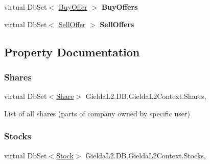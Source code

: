 \begin{DoxyCompactItemize}
virtual Db\+Set$<$ \mbox{\hyperlink{class_gielda_l2_1_1_d_b_1_1_entities_1_1_buy_offer}{Buy\+Offer}} $>$ {\bfseries Buy\+Offers}
\item 
\mbox{\label{class_gielda_l2_1_1_d_b_1_1_gielda_l2_context_a0bf04ba9775656e13e821d2992a83e36}} 
virtual Db\+Set$<$ \mbox{\hyperlink{class_gielda_l2_1_1_d_b_1_1_entities_1_1_sell_offer}{Sell\+Offer}} $>$ {\bfseries Sell\+Offers}
\end{DoxyCompactItemize}


\subsection{Property Documentation}
\mbox{\label{class_gielda_l2_1_1_d_b_1_1_gielda_l2_context_a10444d33001e7c0ae678b54d477a0b60}} 
\subsubsection{\texorpdfstring{Shares}{Shares}}
{\footnotesize\ttfamily virtual Db\+Set$<$\mbox{\hyperlink{class_gielda_l2_1_1_d_b_1_1_entities_1_1_share}{Share}}$>$ Gielda\+L2.\+D\+B.\+Gielda\+L2\+Context.\+Shares\hspace{0.3cm}{\ttfamily [get]}, {\ttfamily [set]}}



List of all shares (parts of company owned by specific user) 

\mbox{\label{class_gielda_l2_1_1_d_b_1_1_gielda_l2_context_aea04642796c9518519cce75620c7cb9d}} 
\subsubsection{\texorpdfstring{Stocks}{Stocks}}
{\footnotesize\ttfamily virtual Db\+Set$<$\mbox{\hyperlink{class_gielda_l2_1_1_d_b_1_1_entities_1_1_stock}{Stock}}$>$ Gielda\+L2.\+D\+B.\+Gielda\+L2\+Context.\+Stocks\hspace{0.3cm}{\ttfamily [get]}, {\ttfamily [set]}}




